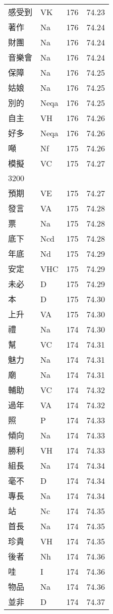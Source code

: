 \documentclass[twocolumn]{book}
\begin{document}
\begin{supertabular}{llrr}
感受到 & VK & 176 &  74.23\\
著作 & Na & 176 &  74.24\\
財團 & Na & 176 &  74.24\\
音樂會 & Na & 176 &  74.24\\
保障 & Na & 176 &  74.25\\
姑娘 & Na & 176 &  74.25\\
別的 & Neqa & 176 &  74.25\\
自主 & VH & 176 &  74.26\\
好多 & Neqa & 176 &  74.26\\
噸 & Nf & 175 &  74.26\\
模擬 & VC & 175 &  74.27\\
3200\\
預期 & VE & 175 &  74.27\\
發言 & VA & 175 &  74.28\\
票 & Na & 175 &  74.28\\
底下 & Ncd & 175 &  74.28\\
年底 & Nd & 175 &  74.29\\
安定 & VHC & 175 &  74.29\\
未必 & D & 175 &  74.29\\
本 & D & 175 &  74.30\\
上升 & VA & 175 &  74.30\\
禮 & Na & 174 &  74.30\\
幫 & VC & 174 &  74.31\\
魅力 & Na & 174 &  74.31\\
廟 & Na & 174 &  74.31\\
輔助 & VC & 174 &  74.32\\
過年 & VA & 174 &  74.32\\
照 & P & 174 &  74.33\\
傾向 & Na & 174 &  74.33\\
勝利 & VH & 174 &  74.33\\
組長 & Na & 174 &  74.34\\
毫不 & D & 174 &  74.34\\
專長 & Na & 174 &  74.34\\
站 & Nc & 174 &  74.35\\
首長 & Na & 174 &  74.35\\
珍貴 & VH & 174 &  74.35\\
後者 & Nh & 174 &  74.36\\
哇 & I & 174 &  74.36\\
物品 & Na & 174 &  74.36\\
並非 & D & 174 &  74.37\\

\end{supertabular}
\end{document}
